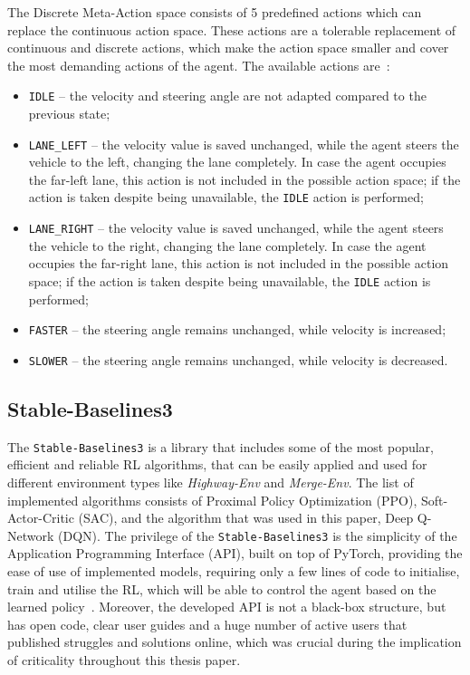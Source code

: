The Discrete Meta-Action space consists of 5 predefined actions which can replace the continuous action space. These actions are a tolerable replacement of continuous and discrete actions, which make the action space smaller and cover the most demanding actions of the agent. The available actions are~\cite{highwayenv2025}:

\begin{itemize}
    \item \texttt{IDLE} -- the velocity and steering angle are not adapted compared to the previous state;
    \item \texttt{LANE\_LEFT} -- the velocity value is saved unchanged, while the agent steers the vehicle to the left, changing the lane completely. In case the agent occupies the far-left lane, this action is not included in the possible action space; if the action is taken despite being unavailable, the \texttt{IDLE} action is performed;
    \item \texttt{LANE\_RIGHT} -- the velocity value is saved unchanged, while the agent steers the vehicle to the right, changing the lane completely. In case the agent occupies the far-right lane, this action is not included in the possible action space; if the action is taken despite being unavailable, the \texttt{IDLE} action is performed;
    \item \texttt{FASTER} -- the steering angle remains unchanged, while velocity is increased;
    \item \texttt{SLOWER} -- the steering angle remains unchanged, while velocity is decreased.
\end{itemize}

\subsection{Stable-Baselines3}

The \texttt{Stable-Baselines3} is a library that includes some of the most popular, efficient and reliable RL algorithms, that can be easily applied and used for different environment types like \emph{Highway-Env} and \emph{Merge-Env}. The list of implemented algorithms consists of Proximal Policy Optimization (PPO), Soft-Actor-Critic (SAC), and the algorithm that was used in this paper, Deep Q-Network (DQN). The privilege of the \texttt{Stable-Baselines3} is the simplicity of the Application Programming Interface (API), built on top of PyTorch, providing the ease of use of implemented models, requiring only a few lines of code to initialise, train and utilise the RL, which will be able to control the agent based on the learned policy~\cite{stable-baselines3}. Moreover, the developed API is not a black-box structure, but has open code, clear user guides and a huge number of active users that published struggles and solutions online, which was crucial during the implication of criticality throughout this thesis paper.

